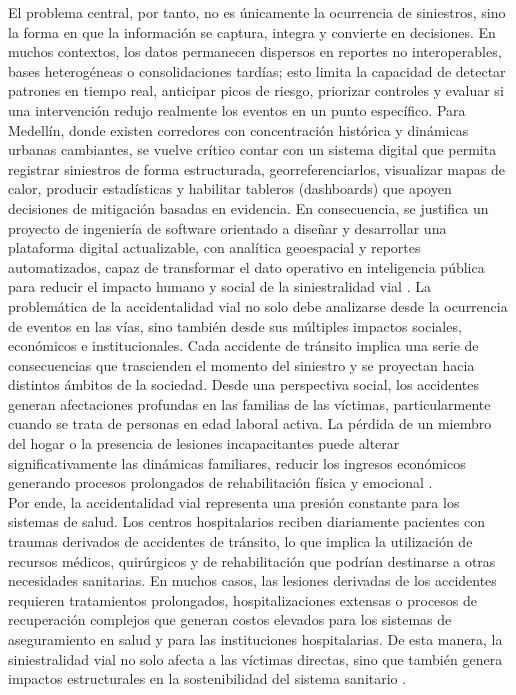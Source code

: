 El problema central, por tanto, no es únicamente la ocurrencia de siniestros, sino la forma en que la información se captura, integra y convierte en decisiones. En muchos contextos, los datos permanecen dispersos en reportes no interoperables, bases heterogéneas o consolidaciones tardías; esto limita la capacidad de detectar patrones en tiempo real, anticipar picos de riesgo, priorizar controles y evaluar si una intervención redujo realmente los eventos en un punto específico. Para Medellín, donde existen corredores con concentración histórica y dinámicas urbanas cambiantes, se vuelve crítico contar con un sistema digital que permita registrar siniestros de forma estructurada, georreferenciarlos, visualizar mapas de calor, producir estadísticas y habilitar tableros (dashboards) que apoyen decisiones de mitigación basadas en evidencia. En consecuencia, se justifica un proyecto de ingeniería de software orientado a diseñar y desarrollar una plataforma digital actualizable, con analítica geoespacial y reportes automatizados, capaz de transformar el dato operativo en inteligencia pública para reducir el impacto humano y social de la siniestralidad vial \cite{aguilar2023}.
La problemática de la accidentalidad vial no solo debe analizarse desde la ocurrencia de eventos en las vías, sino también desde sus múltiples impactos sociales, económicos e institucionales. Cada accidente de tránsito implica una serie de consecuencias que trascienden el momento del siniestro y se proyectan hacia distintos ámbitos de la sociedad. Desde una perspectiva social, los accidentes generan afectaciones profundas en las familias de las víctimas, particularmente cuando se trata de personas en edad laboral activa. La pérdida de un miembro del hogar o la presencia de lesiones incapacitantes puede alterar significativamente las dinámicas familiares, reducir los ingresos económicos generando procesos prolongados de rehabilitación física y emocional \cite{torres2022}.\\
Por ende, la accidentalidad vial representa una presión constante para los sistemas de salud. Los centros hospitalarios reciben diariamente pacientes con traumas derivados de accidentes de tránsito, lo que implica la utilización de recursos médicos, quirúrgicos y de rehabilitación que podrían destinarse a otras necesidades sanitarias. En muchos casos, las lesiones derivadas de los accidentes requieren tratamientos prolongados, hospitalizaciones extensas o procesos de recuperación complejos que generan costos elevados para los sistemas de aseguramiento en salud y para las instituciones hospitalarias. De esta manera, la siniestralidad vial no solo afecta a las víctimas directas, sino que también genera impactos estructurales en la sostenibilidad del sistema sanitario \cite{follana2024}.\\
